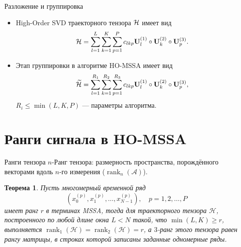 \documentclass[ucs, notheorems, handout]{beamer}
\newcommand{\bluetext}[1]{{\usebeamercolor[fg]{bluetext_color}#1}}
\newtheorem{theorem}{Теорема}
\begin{document}
    \begin{frame}{Разложение и группировка}
        \begin{itemize}
            \item High-Order SVD траекторного тензора $\mathcal{H}$ имеет вид
            \[
                \mathcal{H} = \sum_{l=1}^{L} \sum_{k=1}^{K} \sum_{p=1}^{P} c_{lkp} \mathbf{U}^{(1)}_{l}
                \circ \mathbf{U}^{(2)}_{k} \circ \mathbf{U}^{(3)}_{p}.
            \]

            \vspace{0.4cm}
            \item Этап группировки в алгоритме HO-MSSA имеет вид
            \[
                \widetilde{\mathcal{H}} = \sum_{l=1}^{R_1} \sum_{k=1}^{R_2} \sum_{p=1}^{R_3} c_{lkp} \mathbf{U}^{(1)}_{l}
                \circ \mathbf{U}^{(2)}_{k} \circ \mathbf{U}^{(3)}_{p},
            \]
            $R_i\leqslant \min(L, K, P)$ --- параметры алгоритма.
        \end{itemize}
    \end{frame}


    \section{Ранги сигнала в HO-MSSA}\label{sec:tensor-ranks}
    \begin{frame}{Ранги тензора}
        \bluetext{$n$-Ранг тензора:} размерность пространства, порождённого
        векторами вдоль $n$-го измерения ($\operatorname{rank}_n(\mathcal{A})$).

        \begin{theorem}
            Пусть многомерный временной ряд
            \[
                \left( x_0^{(p)}, x_1^{(p)}, \ldots, x_{N-1}^{(p)} \right), \quad p=1, 2,\ldots, P
            \]
            имеет ранг $r$ в терминах MSSA, тогда для траекторного тензора $\mathcal{H}$, построенного по любой длине окна $L<N$
            такой, что ${\min(L, K) \geqslant r}$, выполняется $\operatorname{rank}_1(\mathcal{H})=\operatorname{rank}_2(\mathcal{H})=r$,
            а $3$-ранг этого тензора равен рангу матрицы, в строках которой записаны заданные одномерные ряды.
        \end{theorem}
    \end{frame}
\end{document}
